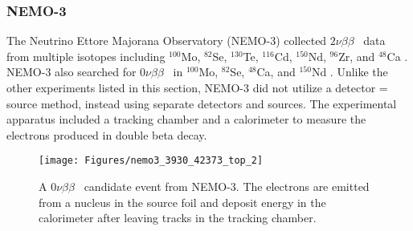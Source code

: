 \documentclass[12pt,a4paper]{article}
\newcommand{\zeronubb}{$0\nu \beta \beta$}
\newcommand{\twonubb}{$2\nu \beta \beta$}
\begin{document}
\begin{comment}
\subsubsection*{EXO-200}
The Enriched Xenon Observatory (EXO) is an experiment searching for \zeronubb~ in 80.6\% enriched $^{136}$Xe \cite{Albert:2014awa}. The Xe is used as a liquid time projection chamber (TPC) that can record the spatial components of ionization signals. This experiment benefits from the self-shielding of Xe, as the $\gamma$ attenuation length can be much smaller than the size of the detector itself.

\begin{figure}[htpb]
\centering
\texttt{[image: Figures/EXO.png]}
\caption[Cutaway view of the EXO-200 experimental apparatus.]{Cutaway view of the EXO-200 experimental apparatus. Figure from \cite{Auger:2012gs}}
\label{fig:jinst1205p05010}
\end{figure}
\end{comment}

\subsubsection*{NEMO-3}
The Neutrino Ettore Majorana Observatory (NEMO-3) collected \twonubb~ data from multiple isotopes including $^{100}$Mo, $^{82}$Se, $^{130}$Te, $^{116}$Cd, $^{150}$Nd, $^{96}$Zr, and $^{48}$Ca \cite{Bongrand:2011ei}. NEMO-3 also searched for \zeronubb~ in $^{100}$Mo, $^{82}$Se, $^{48}$Ca, and $^{150}$Nd \cite{Bongrand:2011ei}\cite{::2016dpe}\cite{Arnold:2016ezh}. Unlike the other experiments listed in this section, NEMO-3 did not utilize a detector = source method, instead using separate detectors and sources. The experimental apparatus included a tracking chamber and a calorimeter to measure the electrons produced in double beta decay.

\begin{figure}[htbp]
\centering
\texttt{[image: Figures/nemo3\_3930\_42373\_top\_2]}
\caption{A \zeronubb~ candidate event from NEMO-3. The electrons are emitted from a nucleus in the source foil and deposit energy in the calorimeter after leaving tracks in the tracking chamber.}
\label{fig:nemo3393042373top2}
\end{figure}


\end{document}
